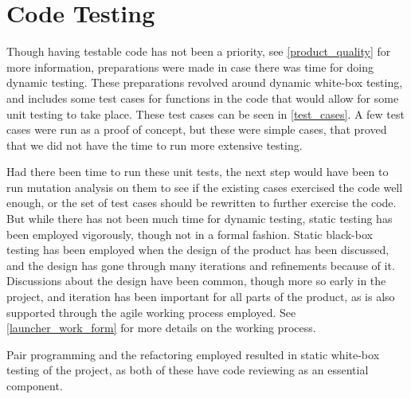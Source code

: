 \chapter{Code Testing}
Though having testable code has not been a priority, see \autoref{product_quality} for more information, preparations were made in case there was time for doing dynamic testing. 
These preparations revolved around dynamic white-box testing, and includes some test cases for functions in the code that would allow for some unit testing to take place. 
These test cases can be seen in \autoref{test_cases}. 
A few test cases were run as a proof of concept, but these were simple cases, that proved that we did not have the time to run more extensive testing. 

Had there been time to run these unit tests, the next step would have been to run mutation analysis on them to see if the existing cases exercised the code well enough, or the set of test cases should be rewritten to further exercise the code. \\

But while there has not been much time for dynamic testing, static testing has been employed vigorously, though not in a formal fashion. 
Static black-box testing has been employed when the design of the product has been discussed, and the design has gone through many iterations and refinements because of it. 
Discussions about the design have been common, though more so early in the project, and iteration has been important for all parts of the product, as is also supported through the agile working process employed. 
See \autoref{launcher_work_form} for more details on the working process. \newline

Pair programming and the refactoring employed resulted in static white-box testing of the project, as both of these have code reviewing as an essential component. 